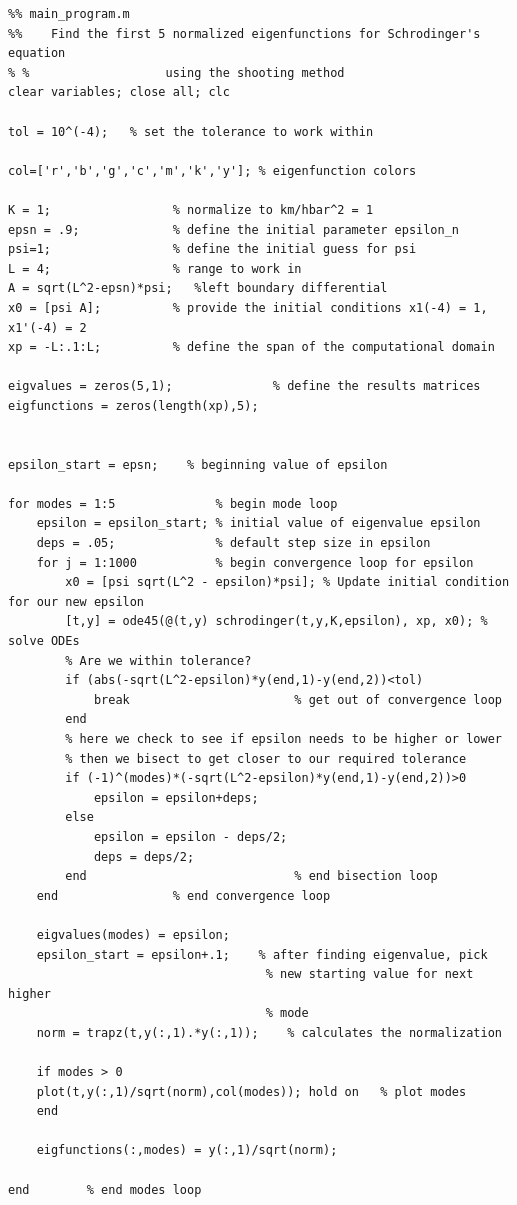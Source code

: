 \documentclass{article}
\begin{document}
\begin{verbatim}
%% main_program.m
%%    Find the first 5 normalized eigenfunctions for Schrodinger's equation 
% %                   using the shooting method
clear variables; close all; clc

tol = 10^(-4);   % set the tolerance to work within

col=['r','b','g','c','m','k','y']; % eigenfunction colors

K = 1;                 % normalize to km/hbar^2 = 1
epsn = .9;             % define the initial parameter epsilon_n
psi=1;                 % define the initial guess for psi
L = 4;                 % range to work in
A = sqrt(L^2-epsn)*psi;   %left boundary differential
x0 = [psi A];          % provide the initial conditions x1(-4) = 1, x1'(-4) = 2
xp = -L:.1:L;          % define the span of the computational domain

eigvalues = zeros(5,1);              % define the results matrices
eigfunctions = zeros(length(xp),5);


epsilon_start = epsn;    % beginning value of epsilon

for modes = 1:5              % begin mode loop
    epsilon = epsilon_start; % initial value of eigenvalue epsilon
    deps = .05;              % default step size in epsilon
    for j = 1:1000           % begin convergence loop for epsilon
        x0 = [psi sqrt(L^2 - epsilon)*psi]; % Update initial condition for our new epsilon
        [t,y] = ode45(@(t,y) schrodinger(t,y,K,epsilon), xp, x0); % solve ODEs
        % Are we within tolerance?
        if (abs(-sqrt(L^2-epsilon)*y(end,1)-y(end,2))<tol)
            break                       % get out of convergence loop
        end
        % here we check to see if epsilon needs to be higher or lower
        % then we bisect to get closer to our required tolerance
        if (-1)^(modes)*(-sqrt(L^2-epsilon)*y(end,1)-y(end,2))>0     
            epsilon = epsilon+deps;    
        else
            epsilon = epsilon - deps/2;
            deps = deps/2;
        end                             % end bisection loop
    end                % end convergence loop
    
    eigvalues(modes) = epsilon;
    epsilon_start = epsilon+.1;    % after finding eigenvalue, pick
                                    % new starting value for next higher
                                    % mode
    norm = trapz(t,y(:,1).*y(:,1));    % calculates the normalization
    
    if modes > 0
    plot(t,y(:,1)/sqrt(norm),col(modes)); hold on   % plot modes
    end
    
    eigfunctions(:,modes) = y(:,1)/sqrt(norm);
    
end        % end modes loop
\end{verbatim}
\end{document}
